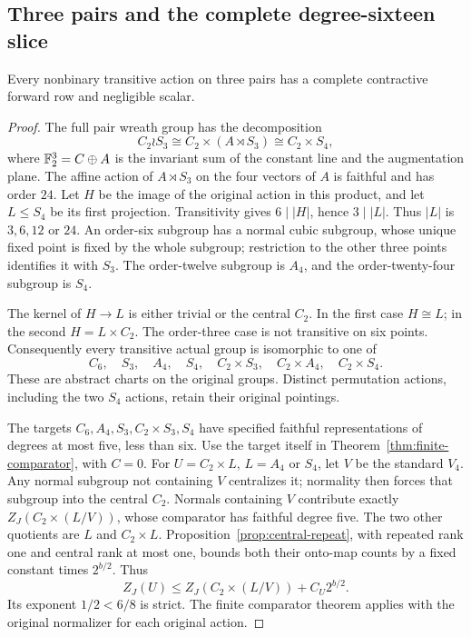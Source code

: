 \subsection{Three pairs and the complete degree-sixteen slice}

\begin{proposition}\label{prop:three-pair-actions}
Every nonbinary transitive action on three pairs has a complete
contractive forward row and negligible scalar.
\end{proposition}
\begin{proof}
The full pair wreath group has the decomposition
\[
 C_2\wr S_3\cong C_2\times(A\rtimes S_3)
 \cong C_2\times S_4,
\]
where $\mathbb F_2^3=C\oplus A$ is the invariant sum of the constant line
and the augmentation plane. The affine action of $A\rtimes S_3$
on the four vectors of $A$ is faithful and has order $24$.
Let $H$ be the image of the original action in this product, and let
$L\leq S_4$ be its first projection. Transitivity gives $6\mid|H|$,
hence $3\mid|L|$. Thus $|L|$ is $3,6,12$ or $24$.
An order-six subgroup has a normal cubic subgroup, whose unique fixed
point is fixed by the whole subgroup; restriction to the other three
points identifies it with $S_3$. The order-twelve subgroup is $A_4$,
and the order-twenty-four subgroup is $S_4$.

The kernel of $H\to L$ is either trivial or the central $C_2$.
In the first case $H\cong L$; in the second $H=L\times C_2$.
The order-three case is not transitive on six points. Consequently every
transitive actual group is isomorphic to one of
\[
 C_6,\quad S_3,\quad A_4,\quad S_4,\quad
 C_2\times S_3,\quad C_2\times A_4,\quad C_2\times S_4.
\]
These are abstract charts on the original groups. Distinct permutation
actions, including the two $S_4$ actions, retain their original pointings.

The targets $C_6,A_4,S_3,C_2\times S_3,S_4$ have specified
faithful representations of degrees at most five, less than six.
Use the target itself in Theorem~\ref{thm:finite-comparator},
with $C=0$. For $U=C_2\times L$, $L=A_4$ or $S_4$, let
$V$ be the standard $V_4$. Any normal subgroup not containing
$V$ centralizes it; normality then forces that subgroup into the
central $C_2$. Normals containing $V$ contribute exactly
$Z_J(C_2\times(L/V))$, whose comparator has faithful degree five.
The two other quotients are $L$ and $C_2\times L$.
Proposition~\ref{prop:central-repeat}, with repeated rank one
and central rank at most one, bounds both their onto-map counts
by a fixed constant times $2^{b/2}$. Thus
\[
 Z_J(U)\leq Z_J(C_2\times(L/V))+C_U2^{b/2}.
\]
Its exponent $1/2<6/8$ is strict. The finite comparator theorem
applies with the original normalizer for each original action.
\end{proof}

